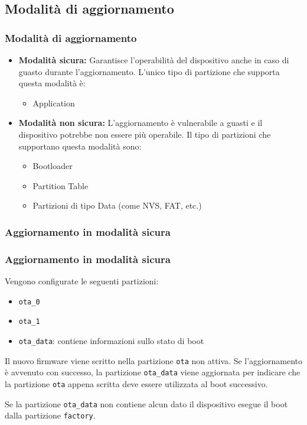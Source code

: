 \documentclass{beamer}
\begin{document}
\subsection{Modalità di aggiornamento}
\begin{frame}
\frametitle{Modalità di aggiornamento}
\begin{itemize}
  \item \textbf{Modalità sicura:} Garantisce l'operabilità del dispositivo anche in
    caso di guasto durante l'aggiornamento. L'unico tipo di partizione che supporta
    questa modalità è:
    \begin{itemize}
      \item Application
    \end{itemize}
  \item \textbf{Modalità non sicura:} L'aggiornamento è vulnerabile a guasti e il
    dispositivo potrebbe non essere più operabile. Il tipo di partizioni che supportano
    questa modalità sono:
    \begin{itemize}
      \item Bootloader
      \item Partition Table
      \item Partizioni di tipo Data (come NVS, FAT, etc.)
    \end{itemize}
\end{itemize}
\end{frame}

\subsubsection{Aggiornamento in modalità sicura}
\begin{frame}
\frametitle{Aggiornamento in modalità sicura}
Vengono configurate le seguenti partizioni:
\begin{itemize}
  \item \texttt{ota\_0}
  \item \texttt{ota\_1}
  \item \texttt{ota\_data}: contiene informazioni sullo stato di boot
\end{itemize}
Il nuovo firmware viene scritto nella partizione \texttt{ota} non attiva.
Se l'aggiornamento è avvenuto con successo, la partizione \texttt{ota\_data}
viene aggiornata per indicare che la partizione \texttt{ota} appena scritta deve essere
utilizzata al boot successivo.

\vspace{1em}
\noindent
Se la partizione \texttt{ota\_data} non contiene
alcun dato il dispositivo esegue il boot dalla partizione \texttt{factory}.
\end{frame}
\end{document}
